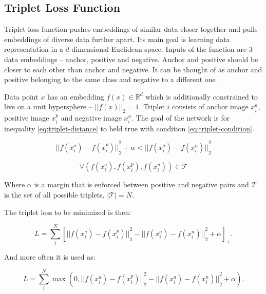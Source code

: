 \subsection{Triplet Loss Function}

Triplet loss function pushes embeddings of similar data closer together and pulls embeddings of diverse data further apart. Its main goal is learning data representation in a $d$-dimensional Euclidean space. Inputs of the function are 3 data embeddings -- anchor, positive and negative. Anchor and positive should be closer to each other than anchor and negative. It can be thought of as anchor and positive belonging to the same class and negative to a different one \cite{facenet-triplet-loss}.

Data point $x$ has an embedding $f(x) \in \mathbb{R}^d$ which is additionally constrained to live on a unit hypersphere -- ${|| f(x) ||}_2 = 1$. Triplet $i$ consists of anchor image $x^{a}_{i}$, positive image $x^{p}_{i}$ and negative image $x^{n}_{i}$. The goal of the network is for inequality  \ref{eq:triplet-distance} to held true with condition \ref{eq:triplet-condition}.

\begin{equation}
    \label{eq:triplet-distance}
    {|| f(x^{a}_{i}) - f(x^{p}_{i}) ||}^{2}_{2} + \alpha < {|| f(x^{a}_{i}) - f(x^{n}_{i}) ||}^{2}_{2}
\end{equation}

\begin{equation}
    \label{eq:triplet-condition}
    \forall ( f(x^{a}_{i}), f(x^{p}_{i}), f(x^{n}_{i})) \in \mathcal{T}
\end{equation}

\noindent Where $\alpha$ is a margin that is enforced between positive and negative pairs and $\mathcal{T}$ is the set of all possible triplets, $|\mathcal{T}| = N$.

The triplet loss to be minimized is then:

\begin{equation}
    \label{eq:triplet-loss1}
    L = \sum\limits^{N}_{i}
    \left[
    {|| f(x^{a}_{i}) - f(x^{p}_{i}) ||}^{2}_{2} - {|| f(x^{a}_{i}) - f(x^{n}_{i}) ||}^{2}_{2} + \alpha
    \right]_{+}.
\end{equation}

\noindent And more often it is used as:

\begin{equation}
    \label{eq:triplet-loss2}
    L = \sum\limits^{N}_{i}
    \max{(0, {|| f(x^{a}_{i}) - f(x^{p}_{i}) ||}^{2}_{2} - {|| f(x^{a}_{i}) - f(x^{n}_{i}) ||}^{2}_{2} + \alpha)}.
\end{equation}

